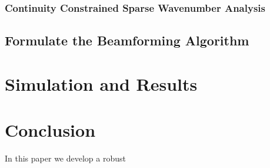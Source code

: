 \documentclass{article}
\begin{document}
\subsubsection{Continuity Constrained Sparse Wavenumber Analysis}

\subsection{Formulate the Beamforming Algorithm}

\section{Simulation and Results}

\section{Conclusion}
In this paper we develop a robust


\newpage


\end{document}
